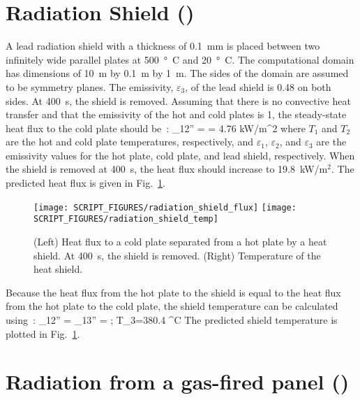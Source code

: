 \documentclass[11pt]{book}
\begin{document}
\section{Radiation Shield (\texorpdfstring{}{radiation\_shield}) }
\label{radiation_shield}

A lead radiation shield with a thickness of 0.1~mm is placed between two infinitely wide parallel plates at 500~\si{\degree C} and 20~\si{\degree C}.  The computational domain has dimensions of 10~m by 0.1~m by 1~m. The sides of the domain are assumed to be symmetry planes.  The emissivity, $\varepsilon_{3}$, of the lead shield is 0.48 on both sides.  At 400~s, the shield is removed.  Assuming that there is no convective heat transfer and that the emissivity of the hot and cold plates is 1, the steady-state heat flux to the cold plate should be~\cite{Incropera:1}:
\be
   \dq_{12}'' =  = 4.76 \; \hbox{kW/m}^2
\ee
where $T_{1}$ and $T_{2}$ are the hot and cold plate temperatures, respectively, and $\varepsilon_1$, $\varepsilon_2$, and $\varepsilon_3$ are the emissivity values for the hot plate, cold plate, and lead shield, respectively. When the shield is removed at 400~s, the heat flux should increase to 19.8~kW/m$^2$.  The predicted heat flux is given in Fig.~\ref{radiation_shield_plot}.
\begin{figure}[ht]
\texttt{[image: SCRIPT\_FIGURES/radiation\_shield\_flux]}
\texttt{[image: SCRIPT\_FIGURES/radiation\_shield\_temp]}
\caption[The  test case]{(Left) Heat flux to a cold plate separated from a hot plate by a heat shield. At 400~s, the shield is removed. (Right) Temperature of the heat shield.}
\label{radiation_shield_plot}
\end{figure}
Because the heat flux from the hot plate to the shield is equal to the heat flux from the hot plate to the cold plate, the shield temperature can be calculated using~\cite{Incropera:1}:
\be
   \dq_{12}'' = \dq_{13}'' =  \quad ; \quad T_3=380.4 \; ^\circ\hbox{C}
\ee
The predicted shield temperature is plotted in Fig.~\ref{radiation_shield_plot}.


\section{Radiation from a gas-fired panel (\texorpdfstring{}{radiation\_gas\_panel}) }
\label{radiation_gas_panel}
\end{document}

